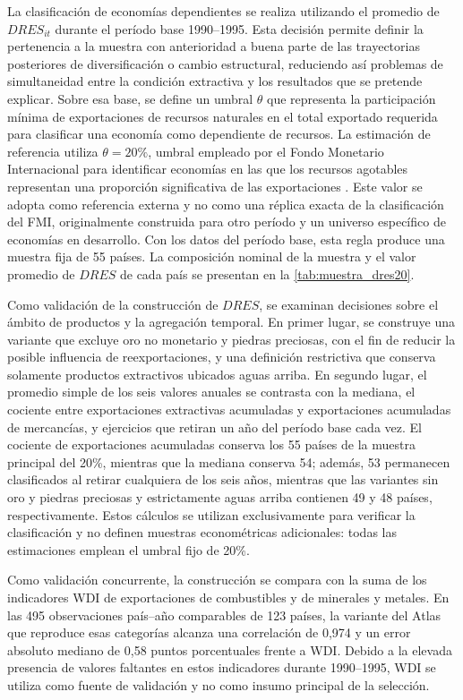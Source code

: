 \documentclass[../../TFM.tex]{subfiles}
\begin{document}
	La clasificación de economías dependientes se realiza utilizando el
	promedio de $DRES_{it}$ durante el período base 1990--1995. Esta decisión
	permite definir la pertenencia a la muestra con anterioridad a buena
	parte de las trayectorias posteriores de diversificación o cambio
	estructural, reduciendo así problemas de simultaneidad entre la
	condición extractiva y los resultados que se pretende explicar. Sobre esa
	base, se define un umbral $\theta$ que representa la participación mínima
	de exportaciones de recursos naturales en el total exportado requerida
	para clasificar una economía como dependiente de recursos. La estimación
	de referencia utiliza $\theta=20\%$, umbral empleado por el Fondo Monetario
	Internacional para identificar economías en las que los recursos agotables
	representan una proporción significativa de las exportaciones
	\parencite{InternationalMonetaryFund2012}. Este valor se adopta como referencia externa y no como
	una réplica exacta de la clasificación del FMI, originalmente construida para
	otro período y un universo específico de economías en desarrollo. Con los
	datos del período base, esta regla produce una muestra fija de 55 países. La
	composición nominal de la muestra y el valor promedio de $DRES$ de cada país
	se presentan en la \autoref{tab:muestra_dres20}.

	Como validación de la construcción de $DRES$, se examinan decisiones sobre
	el ámbito de productos y la agregación temporal. En primer lugar, se
	construye una variante que excluye oro no monetario y piedras preciosas, con el
	fin de reducir la posible influencia de reexportaciones, y una definición
	restrictiva que conserva solamente productos extractivos ubicados aguas arriba.
	En segundo lugar, el promedio simple de los seis valores anuales se contrasta
	con la mediana, el cociente entre exportaciones extractivas acumuladas y
	exportaciones acumuladas de mercancías, y ejercicios que retiran un año del
	período base cada vez. El cociente de exportaciones acumuladas conserva los 55
	países de la muestra principal del 20\%, mientras que la mediana conserva 54;
	además, 53
	permanecen clasificados al retirar cualquiera de los seis años, mientras que
	las variantes sin oro y piedras preciosas y estrictamente aguas arriba contienen
	49 y 48 países, respectivamente. Estos cálculos se utilizan exclusivamente
	para verificar la clasificación y no definen muestras econométricas
	adicionales: todas las estimaciones emplean el umbral fijo de 20\%.

	Como validación concurrente, la construcción se compara con la suma de los
	indicadores WDI de exportaciones de combustibles y de minerales y metales. En
	las 495 observaciones país--año comparables de 123 países, la variante del Atlas
	que reproduce esas categorías alcanza una correlación de 0,974 y un error
	absoluto mediano de 0,58 puntos porcentuales frente a WDI. Debido a la elevada
	presencia de valores faltantes en estos indicadores durante 1990--1995, WDI se
	utiliza como fuente de validación y no como insumo principal de la selección.
\end{document}
